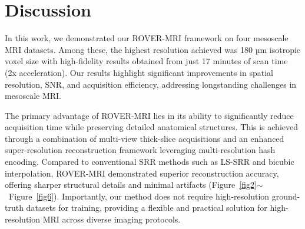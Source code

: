 \documentclass[AMA,STIX2COL]{MRM}
\begin{document}

\section{Discussion}\label{dis}
In this work, we demonstrated our ROVER-MRI framework on four mesoscale MRI datasets. Among these, the highest resolution achieved was 180 µm isotropic voxel size with high-fidelity results obtained from just 17 minutes of scan time (2x acceleration). Our results highlight significant improvements in spatial resolution, SNR, and acquisition efficiency, addressing longstanding challenges in mesoscale MRI.

The primary advantage of ROVER-MRI lies in its ability to significantly reduce acquisition time while preserving detailed anatomical structures. This is achieved through a combination of multi-view thick-slice acquisitions and an enhanced super-resolution reconstruction framework leveraging multi-resolution hash encoding. Compared to conventional SRR methods such as LS-SRR and bicubic interpolation, ROVER-MRI demonstrated superior reconstruction accuracy, offering sharper structural details and minimal artifacts (Figure~\ref{fig2}$\sim$~Figure~\ref{fig6}). Importantly, our method does not require high-resolution ground-truth datasets for training, providing a flexible and practical solution for high-resolution MRI across diverse imaging protocols.
\end{document}
